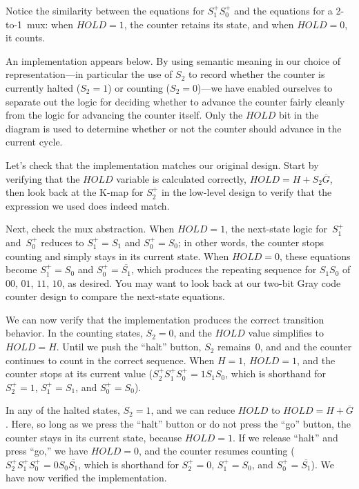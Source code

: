 Notice the similarity between the equations for $S_1^+S_0^+$ and the 
equations for a \mbox{2-to-1}~mux: when $HOLD=1$, the counter retains 
its state, and when $HOLD=0$, it counts.

\vfill

\pagebreak

An implementation appears below.
%
By using semantic meaning in our choice of representation---in
particular the use of $S_2$ to record whether
the counter is currently halted ($S_2=1$) or counting ($S_2=0$)---we
have enabled ourselves to 
separate out the logic for deciding whether to advance the counter
fairly cleanly from the logic for advancing the counter itself.
Only the $HOLD$ bit in the diagram is used to determine
whether or not the counter should advance in the current cycle.

Let's check that the implementation matches our original design.
%
Start by verifying that the $HOLD$ variable is calculated correctly,
$HOLD=H+S_2\overline{G}$,
then look back at the K-map for $S_2^+$ in the low-level design to
verify that the expression we used does indeed match.\\

\centerline{}\vspace{12pt}

Next, check the mux abstraction.
%
When $HOLD=1$, the next-state logic for~$S_1^+$ and~$S_0^+$ 
reduces to $S_1^+=S_1$ and $S_0^+=S_0$;
in other words, the counter stops counting and simply stays in its 
current state.  When $HOLD=0$, these equations become
$S_1^+=S_0$ and $S_0^+=\overline{\mbox{$S_1$}}$, which produces the repeating
sequence for $S_1S_0$ of $00$, $01$, $11$, $10$, as desired.
You may want to look back at our two-bit Gray code counter design
to compare the next-state equations.

We can now verify that the implementation produces the correct transition
behavior.  In the counting states, $S_2=0$, and the $HOLD$ value simplifies
to $HOLD=H$.  Until we push the ``halt'' button, $S_2$ remains~$0$, and
and the counter continues to count in the correct sequence.
When $H=1$, $HOLD=1$, and the counter stops at its current value
($S_2^+S_1^+S_0^+=1S_1S_0$, 
which is shorthand for $S_2^+=1$, $S_1^+=S_1$, and $S_0^+=S_0$).

In any of the halted states, $S_2=1$, and we can reduce $HOLD$ to
$HOLD=H+\overline{G}$.  Here, so long as we press the ``halt'' button
or do not press the ``go'' button, the counter stays in its current
state, because $HOLD=1$.  If we release ``halt'' and press ``go,''
we have $HOLD=0$, and the counter resumes counting
($S_2^+S_1^+S_0^+=0S_0\overline{\mbox{$S_1$}}$,
which is shorthand for $S_2^+=0$, $S_1^+=S_0$, and 
$S_0^+=\overline{\mbox{$S_1$}}$).
%
We have now verified the implementation.

